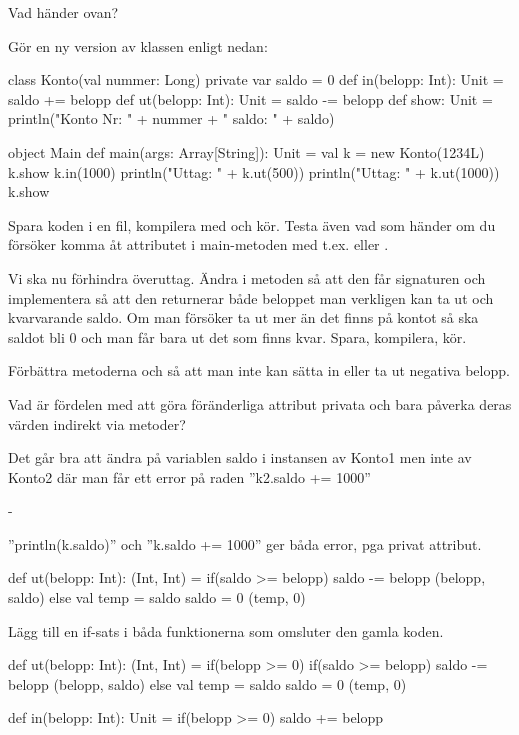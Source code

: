 \Subtask Vad händer ovan?

\Subtask Gör en ny version av klassen  enligt nedan:

\begin{Code}
class Konto(val nummer: Long){
  private var saldo = 0
  def in(belopp: Int): Unit = {saldo += belopp}
  def ut(belopp: Int): Unit = {saldo -= belopp}
  def show: Unit =
    println("Konto Nr: " + nummer + " saldo: " + saldo)
}

object Main {
  def main(args: Array[String]): Unit = {
    val k = new Konto(1234L)
    k.show
    k.in(1000)
    println("Uttag: " + k.ut(500))
    println("Uttag: " + k.ut(1000))
    k.show
  }
}
\end{Code}

\Subtask Spara koden i en fil, kompilera med  och kör. Testa även vad som händer om du försöker komma åt attributet  i main-metoden med t.ex.  eller .

\Subtask Vi ska nu förhindra överuttag. Ändra i metoden  så att den får signaturen  och implementera  så att den returnerar både beloppet man verkligen kan ta ut och kvarvarande saldo. Om man försöker ta ut mer än det finns på kontot så ska saldot bli 0 och man får bara ut det som finns kvar. Spara, kompilera, kör.

\Subtask Förbättra metoderna  och  så att man inte kan sätta in eller ta ut negativa belopp.

\Subtask Vad är fördelen med att göra föränderliga attribut privata och bara påverka deras värden indirekt via metoder?

\SOLUTION


\TaskSolved \what


\SubtaskSolved
Det går bra att ändra på variablen saldo i instansen av Konto1 men inte av Konto2 där man får ett error på raden ''k2.saldo += 1000''

\SubtaskSolved  -

\SubtaskSolved
''println(k.saldo)'' och ''k.saldo += 1000'' ger båda error, pga privat attribut.

\SubtaskSolved
\begin{Code}
def ut(belopp: Int): (Int, Int) = {
	if(saldo >= belopp) {
		saldo -= belopp
		(belopp, saldo)
	} else {
		val temp = saldo
		saldo = 0
		(temp, 0)
	}
}
\end{Code}

\SubtaskSolved
Lägg till en if-sats i båda funktionerna som omsluter den gamla koden.
\begin{Code}
def ut(belopp: Int): (Int, Int) = {
  if(belopp >= 0) {
    if(saldo >= belopp) {
      saldo -= belopp
      (belopp, saldo)
    } else {
      val temp = saldo
      saldo = 0
      (temp, 0)
    }
  }
}

def in(belopp: Int): Unit = {
  if(belopp >= 0) {
    saldo += belopp
  }
}
\end{Code}

